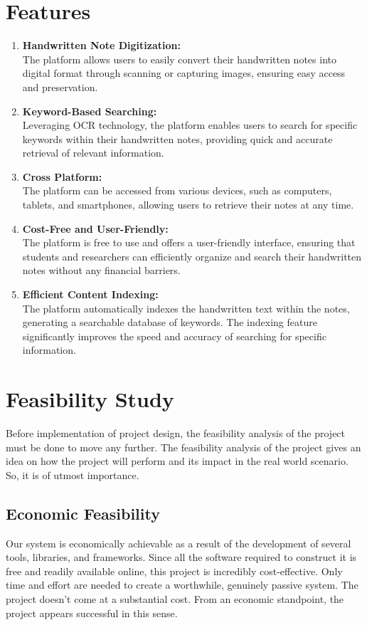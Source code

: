  \section{Features}
 \begin{enumerate}
    \item \textbf{Handwritten Note Digitization:}\\The platform allows users to easily convert their handwritten notes into digital
    format through scanning or capturing images, ensuring easy access and
    preservation.
    \item \textbf{Keyword-Based Searching:}\\Leveraging OCR technology, the platform enables users to search for specific
    keywords within their handwritten notes, providing quick and accurate retrieval of
    relevant information.
    \item \textbf{Cross Platform:}\\The platform can be accessed from various devices, such as computers, tablets,
    and smartphones, allowing users to retrieve their notes at any time.
    \item \textbf{Cost-Free and User-Friendly:}\\The platform is free to use and offers a user-friendly interface, ensuring that
    students and researchers can efficiently organize and search their handwritten
    notes without any financial barriers.
    \item \textbf{Efficient Content Indexing:}\\The platform automatically indexes the handwritten text within the notes,
    generating a searchable database of keywords. The indexing feature significantly
    improves the speed and accuracy of searching for specific information.
 \end{enumerate}
 \section{Feasibility Study}
 Before implementation of project design, the feasibility analysis of the project must be
done to move any further. The feasibility analysis of the project gives an idea on how the
project will perform and its impact in the real world scenario. So, it is of utmost
importance.
 \subsection{Economic Feasibility}
 Our system is economically achievable as a result of the development of several tools,
libraries, and frameworks. Since all the software required to construct it is free and
readily available online, this project is incredibly cost-effective. Only time and effort are
needed to create a worthwhile, genuinely passive system. The project doesn't come at a
substantial cost. From an economic standpoint, the project appears successful in this
sense.
